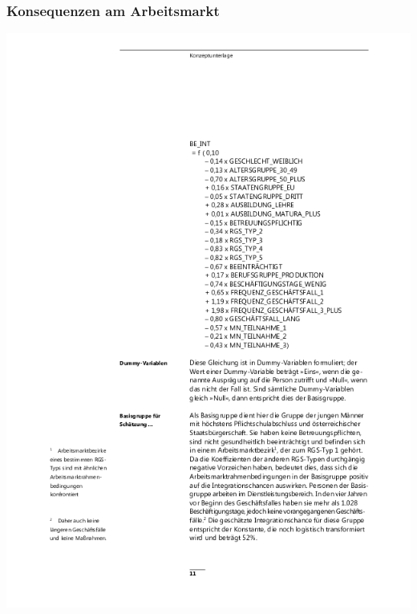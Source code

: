 \documentclass[aspectratio=169,x11names]{beamer}
\begin{document}
\begin{frame}
\frametitle{Konsequenzen am Arbeitsmarkt}
\begin{minipage}{.5\textwidth}
\begin{center}
\includegraphics[height=0.75\textheight, keepaspectratio]{images/negativfaktor}
\end{center}
\end{minipage}\begin{minipage}{.5\textwidth}
\begin{center}

\end{center}
\end{minipage}
\end{frame}
\end{document}
